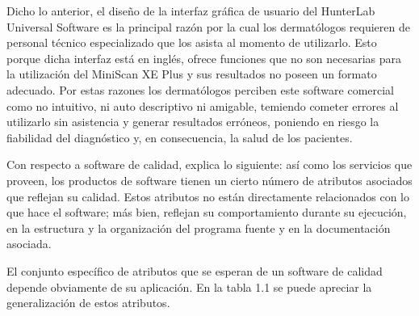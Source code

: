 	Dicho lo anterior, el dise\~{n}o de la interfaz gr\'{a}fica de usuario del HunterLab Universal Software es la principal raz\'{o}n por la cual los dermat\'{o}logos requieren de personal t\'{e}cnico especializado que los asista al momento de utilizarlo. Esto porque dicha interfaz est\'{a} en ingl\'{e}s, ofrece funciones que no son necesarias para la utilizaci\'{o}n del MiniScan XE Plus y sus resultados no poseen un formato adecuado. Por estas razones los dermat\'{o}logos perciben este software comercial como no intuitivo, ni auto descriptivo ni amigable, temiendo cometer errores al utilizarlo sin asistencia y generar resultados err\'{o}neos, poniendo en riesgo la fiabilidad del diagn\'{o}stico y, en consecuencia, la salud de los pacientes.

	Con respecto a software de calidad,  explica lo siguiente: as\'{i} como los servicios que proveen, los productos de software tienen un cierto n\'{u}mero de atributos asociados que reflejan su calidad. Estos atributos no est\'{a}n directamente relacionados con lo que hace el software; m\'{a}s bien, reflejan su comportamiento durante su ejecuci\'{o}n, en la estructura y la organizaci\'{o}n del programa fuente y en la documentaci\'{o}n asociada.

El conjunto espec\'{i}fico de atributos que se esperan de un software de calidad depende obviamente de su aplicaci\'{o}n. En la tabla 1.1 se puede apreciar la generalizaci\'{o}n de estos atributos.

